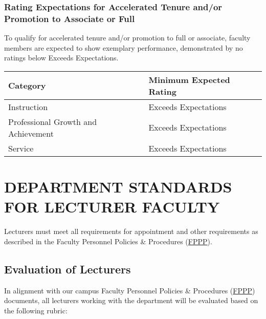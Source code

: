 \documentclass{article}
\begin{document}
\subsubsection{Rating Expectations for Accelerated Tenure and/or Promotion to Associate or Full}
To qualify for accelerated tenure and/or promotion to full or associate, faculty members are expected to show exemplary performance, demonstrated by no ratings below Exceeds Expectations.

\begin{longtable}{p{7cm}p{7cm}}

\hline
\textbf{Category} & \textbf{Minimum Expected Rating} \\
\hline
\endhead %
Instruction 	& Exceeds Expectations \\ \hline
Professional Growth and Achievement 	& Exceeds Expectations \\ \hline
Service 	& Exceeds Expectations \\ \hline
\end{longtable}

\section{DEPARTMENT STANDARDS FOR LECTURER FACULTY}
Lecturers must meet all requirements for appointment and other requirements as described in the Faculty Personnel Policies \& Procedures (\href{https://www.csuchico.edu/oapl/fppp.shtml}{FPPP}).
\subsection{Evaluation of Lecturers}
In alignment with our campus Faculty Personnel Policies \& Procedures (\href{https://www.csuchico.edu/oapl/fppp.shtml}{FPPP}) documents, all lecturers working with the department will be evaluated based on the following rubric:
\end{document}
